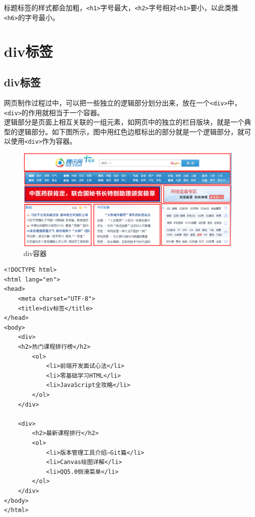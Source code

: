 标题标签的样式都会加粗，\lstinline|<h1>|字号最大，\lstinline|<h2>|字号相对\lstinline|<h1>|要小，以此类推\lstinline|<h6>|的字号最小。

\newpage

\section{div标签}

\subsection{div标签}

网页制作过程过中，可以把一些独立的逻辑部分划分出来，放在一个\lstinline|<div>|中，\lstinline|<div>|的作用就相当于一个容器。 \\

逻辑部分是页面上相互关联的一组元素，如网页中的独立的栏目版块，就是一个典型的逻辑部分。如下图所示，图中用红色边框标出的部分就是一个逻辑部分，就可以使用\lstinline|<div>|作为容器。 \\

\begin{figure}[H]
    \centering
    \includegraphics[scale=0.5]{img/C2/2-3/1.png}
    \caption{div容器}
\end{figure}

\begin{lstlisting}[style=htmlcssjs, title=div标签]
<!DOCTYPE html>
<html lang="en">
<head>
    <meta charset="UTF-8">
    <title>div标签</title>
</head>
<body>
    <div>
    <h2>热门课程排行榜</h2>
        <ol>
            <li>前端开发面试心法</li>
            <li>零基础学习HTML</li>
            <li>JavaScript全攻略</li>
        </ol>
    </div>

    <div>
        <h2>最新课程排行</h2>
        <ol>
            <li>版本管理工具介绍—Git篇</li>
            <li>Canvas绘图详解</li>
            <li>QQ5.0侧滑菜单</li>
        </ol>
    </div>
</body>
</html>
\end{lstlisting}

